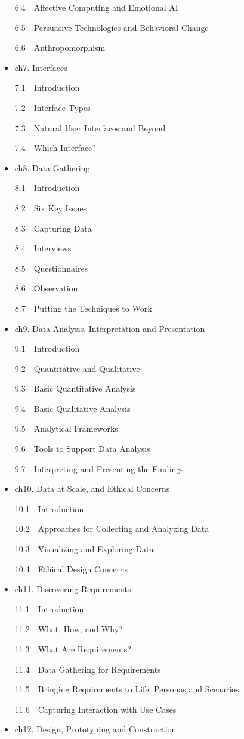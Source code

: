 \documentclass[
  letterpaper,
  DIV=11,
  numbers=noendperiod]{scrreprt}
\begin{document}
\begin{itemize}
  6.4 Affective Computing and Emotional AI

  6.5 Persuasive Technologies and Behavioral Change

  6.6 Anthropomorphism
\item
  ch7. Interfaces

  7.1 Introduction

  7.2 Interface Types

  7.3 Natural User Interfaces and Beyond

  7.4 Which Interface?
\item
  ch8. Data Gathering

  8.1 Introduction

  8.2 Six Key Issues

  8.3 Capturing Data

  8.4 Interviews

  8.5 Questionnaires

  8.6 Observation

  8.7 Putting the Techniques to Work
\item
  ch9. Data Analysis, Interpretation and Presentation

  9.1 Introduction

  9.2 Quantitative and Qualitative

  9.3 Basic Quantitative Analysis

  9.4 Basic Qualitative Analysis

  9.5 Analytical Frameworks

  9.6 Tools to Support Data Analysis

  9.7 Interpreting and Presenting the Findings
\item
  ch10. Data at Scale, and Ethical Concerns

  10.1 Introduction

  10.2 Approaches for Collecting and Analyzing Data

  10.3 Visualizing and Exploring Data

  10.4 Ethical Design Concerns
\item
  ch11. Discovering Requirements

  11.1 Introduction

  11.2 What, How, and Why?

  11.3 What Are Requirements?

  11.4 Data Gathering for Requirements

  11.5 Bringing Requirements to Life: Personas and Scenarios

  11.6 Capturing Interaction with Use Cases
\item
  ch12. Design, Prototyping and Construction


\end{itemize}
\end{document}
